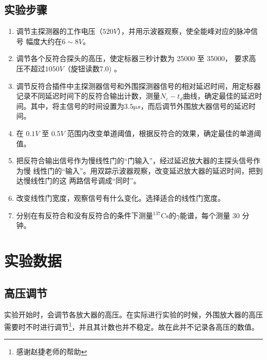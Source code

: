 \documentclass{article}
\begin{document}
\subsection{实验步骤}
\begin{enumerate}
    \item 调节主探测器的工作电压（${520\si{V}}$），并用示波器观察，使全能峰对应的脉冲信号
    幅度大约在$6\sim8\si{V}$。
    \item 调节各个反符合探头的高压，使定标器三秒计数为 25000 至 35000，
    要求高压不超过$1050\si{V}$（旋钮读数7.0) 。
    \item 调节反符合插件中主探测器信号和外围探测器信号的相对延迟时间，用定标器记录不同延迟时间下的反符合输出计数，测量$N_c-t_d$曲线，确定最佳的延迟时间。其中，将主信号的时间设置为$3.5\si{\micro s}$，而后调节外围放大器信号的延迟时间。
    \item 在 $0.1\si{V}$ 至 $0.5\si{V}$ 范围内改变单道阈值，根据反符合的效果，确定最佳的单道阈值。
    \item 把反符合输出信号作为慢线性门的“门输入”，经过延迟放大器的主探头信号作为慢
    线性门的“输入”。用双踪示波器观察，改变延迟放大器的延迟时间，把到达慢线性门的这 两路信号调成“同时”。
    \item 改变线性门宽度，观察信号有什么变化。选择适合的线性门宽度。
    \item 分别在有反符合和没有反符合的条件下测量$^{137}\text{Cs}$的$\gamma$能谱，每个测量 30 分钟。
\end{enumerate}
\section{实验数据}
\subsection{高压调节}
实验开始时，会调节各放大器的高压。在实际进行实验的时候，外围放大器的高压需要时不时进行调节\footnote{感谢赵捷老师的帮助}，并且其计数也并不稳定。故在此并不记录各高压的数值。
\end{document}
